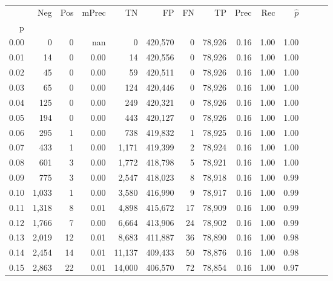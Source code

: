 \begin{tabular}{rrrrrrrrrrrrrr}
\toprule
{} &    Neg &    Pos & mPrec &       TN &       FP &      FN &      TP &  Prec &   Rec & $\hat{p}$ \\
p    &        &        &       &          &          &         &         &       &       &           \\
\midrule
0.00 &      0 &      0 &   nan &        0 &  420,570 &       0 &  78,926 &  0.16 &  1.00 &      1.00 \\
0.01 &     14 &      0 &  0.00 &       14 &  420,556 &       0 &  78,926 &  0.16 &  1.00 &      1.00 \\
0.02 &     45 &      0 &  0.00 &       59 &  420,511 &       0 &  78,926 &  0.16 &  1.00 &      1.00 \\
0.03 &     65 &      0 &  0.00 &      124 &  420,446 &       0 &  78,926 &  0.16 &  1.00 &      1.00 \\
0.04 &    125 &      0 &  0.00 &      249 &  420,321 &       0 &  78,926 &  0.16 &  1.00 &      1.00 \\
0.05 &    194 &      0 &  0.00 &      443 &  420,127 &       0 &  78,926 &  0.16 &  1.00 &      1.00 \\
0.06 &    295 &      1 &  0.00 &      738 &  419,832 &       1 &  78,925 &  0.16 &  1.00 &      1.00 \\
0.07 &    433 &      1 &  0.00 &    1,171 &  419,399 &       2 &  78,924 &  0.16 &  1.00 &      1.00 \\
0.08 &    601 &      3 &  0.00 &    1,772 &  418,798 &       5 &  78,921 &  0.16 &  1.00 &      1.00 \\
0.09 &    775 &      3 &  0.00 &    2,547 &  418,023 &       8 &  78,918 &  0.16 &  1.00 &      0.99 \\
0.10 &  1,033 &      1 &  0.00 &    3,580 &  416,990 &       9 &  78,917 &  0.16 &  1.00 &      0.99 \\
0.11 &  1,318 &      8 &  0.01 &    4,898 &  415,672 &      17 &  78,909 &  0.16 &  1.00 &      0.99 \\
0.12 &  1,766 &      7 &  0.00 &    6,664 &  413,906 &      24 &  78,902 &  0.16 &  1.00 &      0.99 \\
0.13 &  2,019 &     12 &  0.01 &    8,683 &  411,887 &      36 &  78,890 &  0.16 &  1.00 &      0.98 \\
0.14 &  2,454 &     14 &  0.01 &   11,137 &  409,433 &      50 &  78,876 &  0.16 &  1.00 &      0.98 \\
0.15 &  2,863 &     22 &  0.01 &   14,000 &  406,570 &      72 &  78,854 &  0.16 &  1.00 &      0.97 \\

\end{tabular}

